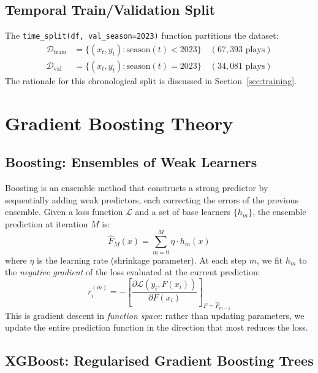 \documentclass[11pt]{article}
\begin{document}
\subsection{Temporal Train/Validation Split}

The \texttt{time\_split(df, val\_season=2023)} function partitions the dataset:
\begin{align*}
  \mathcal{D}_{\text{train}} &= \{(x_t, y_t) : \text{season}(t) < 2023\} \quad (67,393 \text{ plays}) \\
  \mathcal{D}_{\text{val}} &= \{(x_t, y_t) : \text{season}(t) = 2023\} \quad (34,081 \text{ plays})
\end{align*}
The rationale for this chronological split is discussed in
Section~\ref{sec:training}.

\section{Gradient Boosting Theory}
\label{sec:gb}

\subsection{Boosting: Ensembles of Weak Learners}

Boosting is an ensemble method that constructs a strong predictor by
sequentially adding weak predictors, each correcting the errors of the
previous ensemble. Given a loss function $\mathcal{L}$ and a set of base
learners $\{h_m\}$, the ensemble prediction at iteration $M$ is:
\begin{equation}
  \hat{F}_M(x) = \sum_{m=0}^{M} \eta \cdot h_m(x)
\end{equation}
where $\eta$ is the learning rate (shrinkage parameter). At each step $m$, we
fit $h_m$ to the \emph{negative gradient} of the loss evaluated at the current
prediction:
\begin{equation}
  r_i^{(m)} = -\left[ \frac{\partial \mathcal{L}(y_i, F(x_i))}{\partial F(x_i)} \right]_{F = \hat{F}_{m-1}}
\end{equation}
This is gradient descent in \emph{function space}: rather than updating parameters,
we update the entire prediction function in the direction that most reduces the loss.

\subsection{XGBoost: Regularised Gradient Boosting Trees}
\end{document}
